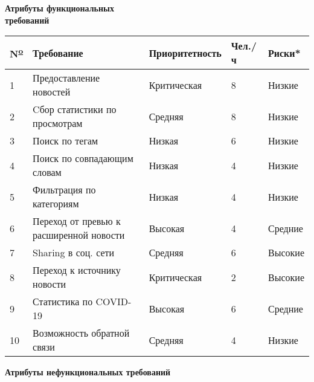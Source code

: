 \begin{center}
    \large
    \textbf{Атрибуты функциональных \\ требований\\}
    \small
    \begin{tabular}{|l|l|l|l|l|}
        \hline
        N\textsuperscript{\underline{o}} & Требование                              & Приоритетность & Чел./ч & Риски*  \\
        \hline
        1                                & Предоставление новостей                 & Критическая    & 8      & Низкие  \\
        \hline
        2                                & Cбор статистики по просмотрам           & Средняя        & 8      & Низкие  \\
        \hline
        3                                & Поиск по тегам                          & Низкая         & 6      & Низкие  \\
        \hline
        4                                & Поиск по совпадающим словам             & Низкая         & 4      & Низкие  \\
        \hline
        5                                & Фильтрация по категориям                & Низкая         & 4      & Низкие  \\
        \hline
        6                                & Переход от превью к расширенной новости & Высокая        & 4      & Средние \\
        \hline
        7                                & Sharing в соц. сети                     & Средняя        & 6      & Высокие \\
        \hline
        8                                & Переход к источнику новости             & Критическая    & 2      & Высокие \\
        \hline
        9                                & Статистика по COVID-19                  & Высокая        & 6      & Средние \\
        \hline
        10                               & Возможность обратной связи              & Средняя        & 4      & Низкие  \\
        \hline
    \end{tabular}
\end{center}
\newpage
\BgThispage
\large
\begin{center}
    \textbf{Атрибуты нефункциональных требований\\}
\end{center}
